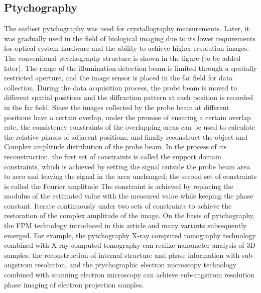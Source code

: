 \documentclass[journal,review,submit,pdftex,moreauthors]{Definitions/mdpi}
\begin{document}
\subsection{Ptychography}
The earliest pytchography was used for crystallography measurements\cite{hoppe1982trace}. Later, it was gradually used in the field of biological imaging due to its lower requirements for optical system hardware and the ability to achieve higher-resolution images. The conventional ptychography structure is shown in the figure (to be added later). The range of the illumination detection beam is limited through a spatially restricted aperture, and the image sensor is placed in the far field for data collection. During the data acquisition process, the probe beam is moved to different spatial positions and the diffraction pattern at each position is recorded in the far field. Since the images collected by the probe beam at different positions have a certain overlap, under the premise of ensuring a certain overlap rate, the consistency constraints of the overlapping areas can be used to calculate the relative phases of adjacent positions, and finally reconstruct the object and Complex amplitude distribution of the probe beam. In the process of its reconstruction, the first set of constraints is called the support domain constraints, which is achieved by setting the signal outside the probe beam area to zero and leaving the signal in the area unchanged; the second set of constraints is called the Fourier amplitude The constraint is achieved by replacing the modulus of the estimated value with the measured value while keeping the phase constant. Iterate continuously under two sets of constraints to achieve the restoration of the complex amplitude of the image\cite{wang2023optical}. On the basis of pytchography, the FPM technology introduced in this article and many variants subsequently emerged. For example, the pytchography X-ray computed tomography technology combined with X-ray computed tomography can realize nanometer analysis of 3D samples, the reconstruction of internal structure and phase information with sub-angstrom resolution, and the ptychographic electron microscopy technology combined with scanning electron microscopy can achieve sub-angstrom resolution phase imaging of electron projection samples\cite{dierolf2010ptychographic,humphry2012ptychographic}.

\end{document}
